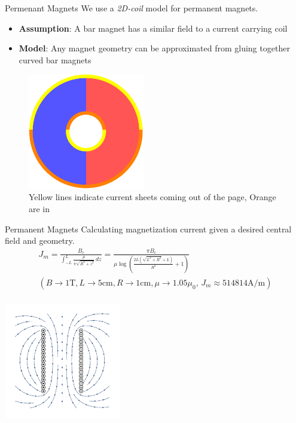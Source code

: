 \documentclass{beamer}
\begin{document}
    \begin{frame}{Permenant Magnets}
        We use a \textit{2D-coil} model for permanent magnets.
        \begin{itemize}
            \item \textbf{Assumption}: A bar magnet has a similar field to a current carrying coil
            \item \textbf{Model}: Any magnet geometry can be approximated from gluing together curved bar magnets
        \end{itemize}
        \begin{figure}
            \center
            \includegraphics[width=2in]{current_magnet.pdf}
            \caption*{Yellow lines indicate current sheets coming out of the page, Orange are in}
        \end{figure}
    \end{frame}
    \begin{frame}{Permanent Magnets}
        Calculating magnetization current given a desired central field and geometry.
        \begin{gather*}
            J_m=\frac{B_c}{\int_{-L}^L \frac{\mu }{\pi  \sqrt{R^2+z^2}} \, dz}=\frac{\pi  B_c}{\mu  \log \left(\frac{2 L \left(\sqrt{L^2+R^2}+L\right)}{R^2}+1\right)}\\
            (B\to 1\text{T},L\to 5\text{cm},R\to 1\text{cm},\mu \to 1.05 \mu _0,\,J_m\approx 514814\text{A}/\text{m})\\
        \end{gather*}
        \begin{center}
            \vspace{-.5cm}
            \includegraphics[width=2in]{magnet_model.pdf}
        \end{center}
    \end{frame}
\end{document}
